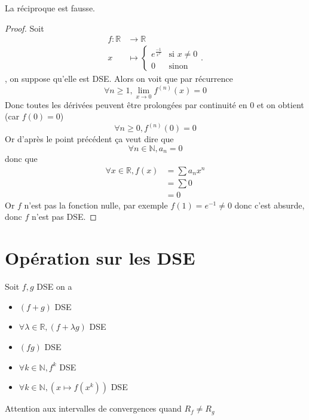 \documentclass[11pt,colorlinks]{book}
\theoremstyle{mytheoremstyle}
\theoremstyle{mytheoremstyle}
\theoremstyle{mytheoremstyle}
\theoremstyle{mytheoremstyle}
\theoremstyle{mytheoremstyle}
\theoremstyle{mytheoremstyle}
\theoremstyle{mytheoremstyle}
\theoremstyle{mytheoremstyle}
\theoremstyle{myproblemstyle}
\def\mbb#1{\mathbb{#1}}
\def\bN{\mbb{N}}
\def\bR{\mbb{R}}
\newcommand{\deq}[3]{\begin{cases}
    #1 & \text{si } #2 \\
    #3 & \text{sinon}
\end{cases}}
\newcommand{\vfunc}[5]{
  \begin{align*}
    #1 \colon #2 &\to #3\\
    #4 &\mapsto #5.
  \end{align*}
}
\begin{document}
\begin{rmq}
  La réciproque est fausse.
  \begin{proof}
    Soit \vfunc{f}{\bR}{\bR}{x}{\deq{e^{\frac{-1}{x^2}}}{x \not= 0}{0}}, on suppose qu'elle est DSE.
    Alors on voit que par récurrence 
    \begin{equation*}
      \forall n \geq 1, \lim_{x\to0} f^{(n)}(x) = 0
    \end{equation*}
    Donc toutes les dérivées peuvent être prolongées par continuité en $0$ et on obtient (car $f(0)=0$)
    \begin{equation*}
      \forall n \geq 0, f^{(n)}(0) = 0
    \end{equation*}
    Or d'après le point précédent ça veut dire que 
    \begin{equation*}
      \forall n \in \bN, a_n = 0
    \end{equation*}
    donc que 
    \begin{align*}
      \forall x \in \bR, f(x) &= \sum a_n x^n \\ 
      &= \sum 0 \\
      &= 0
    \end{align*}
    Or $f$ n'est pas la fonction nulle, par exemple $f(1) = e^{-1} \not= 0$ donc c'est absurde, donc $f$ n'est pas DSE.
  \end{proof}
\end{rmq}
\section{Opération sur les DSE}
\begin{prop}
  Soit $f,g$ DSE on a 
  \begin{itemize}
    \item $(f+g)$ DSE 
    \item $\forall \lambda \in \bR, (f+\lambda g)$ DSE 
    \item $(fg)$ DSE 
    \item $\forall k \in \bN, f^k$ DSE
    \item $\forall k \in \bN, \left(x \mapsto f(x^k)\right)$ DSE
  \end{itemize}
\end{prop}
\begin{rmq}
  Attention aux intervalles de convergences quand $R_f \not= R_g$ 
\end{rmq}
\end{document}
